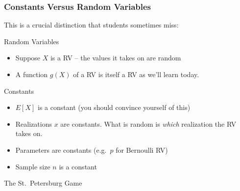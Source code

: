 \documentclass[handout]{beamer}
\begin{document}
\begin{frame}
\frametitle{Constants Versus Random Variables}

 \alert{This is a crucial distinction that students sometimes miss:}
 \vspace{1em}
 

 		\begin{block}{Random Variables}
 			\begin{itemize}
 			\item Suppose $X$ is a RV -- the values it takes on are random
 			\item A function $g(X)$ of a RV is itself a RV as we'll learn today.
 			\end{itemize}
 		\end{block}
 
 		\begin{block}{Constants}
 			\begin{itemize}
 				\item $E[X]$ is a constant (you should convince yourself of this)
 				\item Realizations $x$ are constants. What is random is \emph{which} realization the RV takes on.
 				\item Parameters are constants (e.g.\ $p$ for Bernoulli RV)
 				\item Sample size $n$ is a constant
 			\end{itemize}
 		\end{block} 

\end{frame}
\begin{frame}
\Huge \centering The St.\ Petersburg Game

\end{frame}
\end{document}
